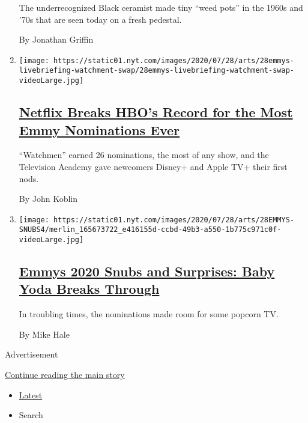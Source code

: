 \begin{enumerate}
  The underrecognized Black ceramist made tiny ``weed pots'' in the
  1960s and '70s that are seen today on a fresh pedestal.

  By Jonathan Griffin
\item
  \texttt{[image: https://static01.nyt.com/images/2020/07/28/arts/28emmys-livebriefing-watchment-swap/28emmys-livebriefing-watchment-swap-videoLarge.jpg]}

  \hypertarget{netflix-breaks-hbos-record-for-the-most-emmy-nominations-ever}{%
  \subsection{\texorpdfstring{\href{/2020/07/28/arts/television/emmy-nominations.html}{Netflix
  Breaks HBO's Record for the Most Emmy Nominations
  Ever}}{Netflix Breaks HBO's Record for the Most Emmy Nominations Ever}}\label{netflix-breaks-hbos-record-for-the-most-emmy-nominations-ever}}

  ``Watchmen'' earned 26 nominations, the most of any show, and the
  Television Academy gave newcomers Disney+ and Apple TV+ their first
  nods.

  By John Koblin
\item
  \texttt{[image: https://static01.nyt.com/images/2020/07/28/arts/28EMMYS-SNUBS4/merlin\_165673722\_e416155d-ccbd-49b3-a550-1b775c971c0f-videoLarge.jpg]}

  \hypertarget{emmys-2020-snubs-and-surprises-baby-yoda-breaks-through}{%
  \subsection{\texorpdfstring{\href{/2020/07/28/arts/television/emmys-snubs-mandalorian-zendaya-reese.html}{Emmys
  2020 Snubs and Surprises: Baby Yoda Breaks
  Through}}{Emmys 2020 Snubs and Surprises: Baby Yoda Breaks Through}}\label{emmys-2020-snubs-and-surprises-baby-yoda-breaks-through}}

  In troubling times, the nominations made room for some popcorn TV.

  By Mike Hale
\end{enumerate}

Advertisement

\protect\hyperlink{after-mid1}{Continue reading the main story}

\begin{itemize}
\tightlist
\item
  \protect\hyperlink{stream-panel}{Latest}
\item
  Search
\end{itemize}

